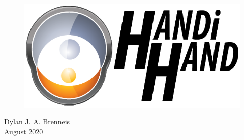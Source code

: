 \documentclass[
11pt, %
oneside, %
english, %
headsepline, %
openany %
]{Manual} %
\author{Dylan J. A. \textsc{Brenneis}} %
\begin{document}
\frontmatter %

\pagestyle{plain} %


\begin{titlepage}

\begin{figure}
\includegraphics[width=0.7\linewidth]{Figures/Handi hand Logo.png}
\end{figure}

\begin{flushright}
\null
\vfill
{\Huge \bfseries \ttitle\par}\vspace{0.6cm} %


\href{http://www.dylanbrenneis.ca}{Dylan J. A. Brenneis}\\%
August 2020
\end{flushright}
\end{titlepage}


\end{document}
